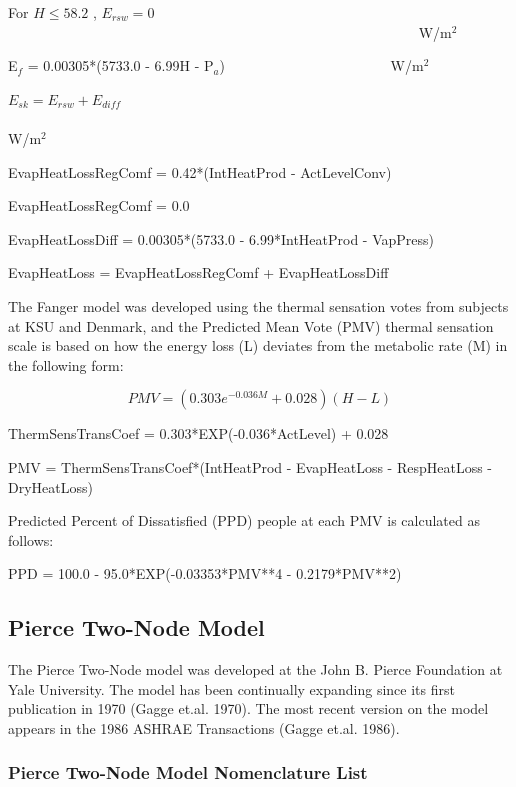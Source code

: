 For \(H \le 58.2\) , \({E_{rsw}} = 0\) ~~~~~~~~~~~~~~~~~~~~~~~~~~~~~~~~~~~~~~~~~~~~~~~~~~~~~~~~~~ W/m\(^{2}\) 

{E\(_{f}\) = 0.00305*(5733.0 - 6.99H - P\(_{a}\))}~~~~~~~~~~~~~~~~~~~~~~~ W/m\(^{2}\)

\({E_{sk}} = {E_{rsw}} + {E_{diff}}\) ~~~~~~~~~~~~~~~~~~~~~~~~~~~~~~~~~~~~~~~~~~~~~~~~~~~~~~~~~~~~~~~~~~~~~ W/m\(^{2}\)

EvapHeatLossRegComf = 0.42*(IntHeatProd - ActLevelConv)

EvapHeatLossRegComf = 0.0

EvapHeatLossDiff = 0.00305*(5733.0 - 6.99*IntHeatProd - VapPress)

EvapHeatLoss = EvapHeatLossRegComf + EvapHeatLossDiff

The Fanger model was developed using the thermal sensation votes from subjects at KSU and Denmark, and the Predicted Mean Vote (PMV) thermal sensation scale is based on how the energy loss (L) deviates from the metabolic rate (M) in the following form:

\begin{equation}
PMV = (0.303{e^{ - 0.036M}} + 0.028)(H - L)
\end{equation}

ThermSensTransCoef = 0.303*EXP(-0.036*ActLevel) + 0.028

PMV = ThermSensTransCoef*(IntHeatProd - EvapHeatLoss - RespHeatLoss - DryHeatLoss)

Predicted Percent of Dissatisfied (PPD) people at each PMV is calculated as follows:

PPD = 100.0 - 95.0*EXP(-0.03353*PMV**4 - 0.2179*PMV**2)

\subsection{Pierce Two-Node Model}\label{pierce-two-node-model}

The Pierce Two-Node model was developed at the John B. Pierce Foundation at Yale University. The model has been continually expanding since its first publication in 1970 (Gagge et.al. 1970). The most recent version on the model appears in the 1986 ASHRAE Transactions (Gagge et.al. 1986).

\subsubsection{Pierce Two-Node Model Nomenclature List}\label{pierce-two-node-model-nomenclature-list}

